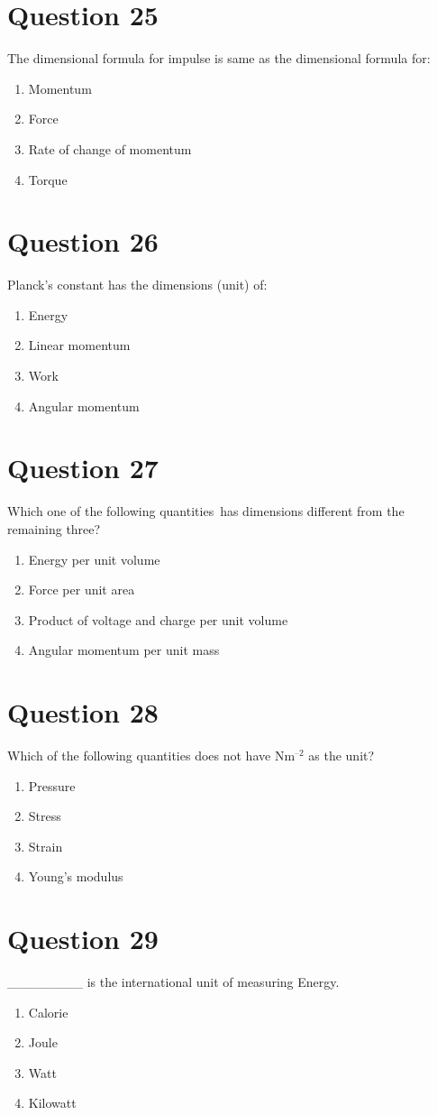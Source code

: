 \documentclass{article}
\begin{document}
\section*{Question 25}
The dimensional formula for impulse is same as the dimensional formula for:
\begin{enumerate}[label=(\alph*)]
\item Momentum
\item Force
\item Rate of change of momentum
\item Torque
\end{enumerate}
\newpage
\section*{Question 26}
Planck's constant has the dimensions (unit) of:
\begin{enumerate}[label=(\alph*)]
\item Energy
\item Linear momentum
\item Work
\item Angular momentum
\end{enumerate}
\newpage
\section*{Question 27}
Which one of the following quantities has dimensions different from the remaining three?
\begin{enumerate}[label=(\alph*)]
\item Energy per unit volume
\item Force per unit area
\item Product of voltage and charge per unit volume
\item Angular momentum per unit mass
\end{enumerate}
\newpage
\section*{Question 28}
Which of the following quantities does not have Nm$^{–2}$ as the unit?
\begin{enumerate}[label=(\alph*)]
\item Pressure
\item Stress
\item Strain
\item Young’s modulus
\end{enumerate}
\newpage
\section*{Question 29}
________ is the international unit of measuring Energy.
\begin{enumerate}[label=(\alph*)]
\item Calorie
\item Joule
\item Watt
\item Kilowatt
\end{enumerate}
\newpage
\end{document}
